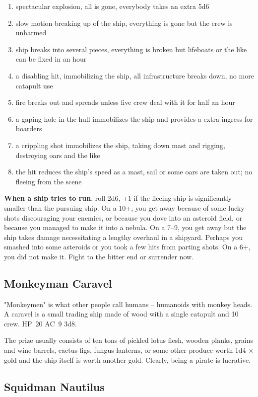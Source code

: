 \documentclass[11pt]{bxart}
\begin{document}
\begin{enumerate}
\item spectacular explosion, all is gone, everybody takes an extra 5d6
\item slow motion breaking up of the ship, everything is gone but the
  crew is unharmed
\item ship breaks into several pieces, everything is broken but
  lifeboats or the like can be fixed in an hour
\item a disabling hit, immobilizing the ship, all infrastructure
  breaks down, no more catapult use
\item fire breaks out and spreads unless five crew deal with it for
  half an hour
\item a gaping hole in the hull immobilizes the ship and provides a
  extra ingress for boarders
\item a crippling shot immobilizes the ship, taking down mast and
  rigging, destroying oars and the like
\item the hit reduces the ship's speed as a mast, sail or some oars
  are taken out; no fleeing from the scene
\end{enumerate}

\textbf{When a ship tries to run}, roll 2d6, +1 if the fleeing ship is
significantly smaller than the pursuing ship. On a 10+, you get away
because of some lucky shots discouraging your enemies, or because you
dove into an asteroid field, or because you managed to make it into a
nebula. On a 7--9, you get away but the ship takes damage
necessitating a lengthy overhaul in a shipyard. Perhaps you smashed
into some asteroids or you took a few hits from parting shots. On a
6+, you did not make it. Fight to the bitter end or surrender now.

\subsection{Monkeyman Caravel}

"Monkeymen" is what other people call humans – humanoids with monkey
heads. A caravel is a small trading ship made of wood with a single
catapult and 10 crew. HP~20 AC~9 3d8.

The prize usually consists of ten tons of pickled lotus flesh, wooden
planks, grains and wine barrels, cactus figs, fungus lanterns, or some
other produce worth 1d4 × \unit[10,000]{gold} and the ship itself is
worth another \unit[10,000]{gold}. Clearly, being a pirate is
lucrative.

\subsection{Squidman Nautilus}
\end{document}
